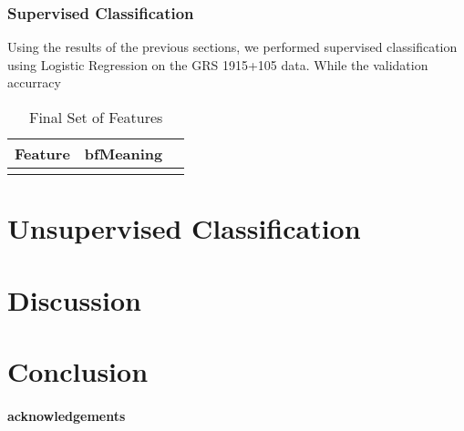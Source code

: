 \documentclass[12pt]{emulateapj}
\begin{document}
\subsubsection{Supervised Classification}

Using the results of the previous sections, we performed supervised classification using Logistic Regression on the GRS 1915+105 data. 
While the validation accurracy


\begin{table*}[hbtp]
\renewcommand{\arraystretch}{1.3}
\footnotesize
\caption{Final Set of Features}
\begin{threeparttable} 
\begin{tabularx}{\textwidth}{p{2.0cm}p{10.0cm}X}%
\toprule
\bf{Feature} & bf{Meaning} 
 \\ \midrule

  \\\bottomrule
\end{tabularx}
   \begin{tablenotes}
      \item{}
\end{tablenotes}
\end{threeparttable}
\label{tab:priortable}
\end{table*}




\section{Unsupervised Classification}


\section{Discussion}


\section{Conclusion}

\paragraph{acknowledgements}



\end{document}
